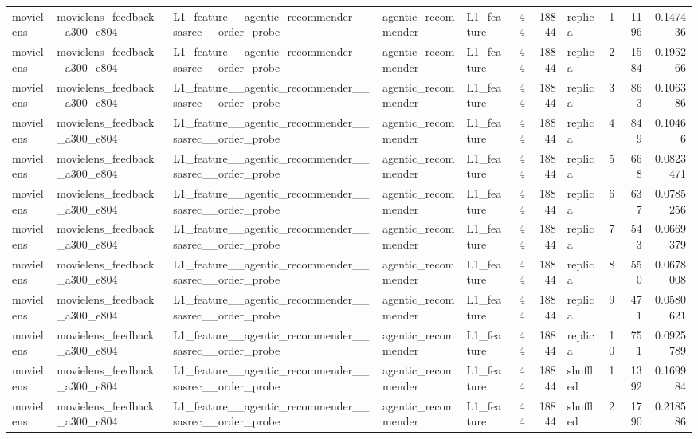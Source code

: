 \begin{table}[htbp!]
\begin{tabular}{lllllrrlrrr}
movielens & movielens\_feedback\_a300\_e804 & L1\_feature\_\_agentic\_recommender\_\_sasrec\_\_order\_probe & agentic\_recommender & L1\_feature & 44 & 18844 & replica & 1 & 1196 & 0.147436 \\
movielens & movielens\_feedback\_a300\_e804 & L1\_feature\_\_agentic\_recommender\_\_sasrec\_\_order\_probe & agentic\_recommender & L1\_feature & 44 & 18844 & replica & 2 & 1584 & 0.195266 \\
movielens & movielens\_feedback\_a300\_e804 & L1\_feature\_\_agentic\_recommender\_\_sasrec\_\_order\_probe & agentic\_recommender & L1\_feature & 44 & 18844 & replica & 3 & 863 & 0.106386 \\
movielens & movielens\_feedback\_a300\_e804 & L1\_feature\_\_agentic\_recommender\_\_sasrec\_\_order\_probe & agentic\_recommender & L1\_feature & 44 & 18844 & replica & 4 & 849 & 0.10466 \\
movielens & movielens\_feedback\_a300\_e804 & L1\_feature\_\_agentic\_recommender\_\_sasrec\_\_order\_probe & agentic\_recommender & L1\_feature & 44 & 18844 & replica & 5 & 668 & 0.0823471 \\
movielens & movielens\_feedback\_a300\_e804 & L1\_feature\_\_agentic\_recommender\_\_sasrec\_\_order\_probe & agentic\_recommender & L1\_feature & 44 & 18844 & replica & 6 & 637 & 0.0785256 \\
movielens & movielens\_feedback\_a300\_e804 & L1\_feature\_\_agentic\_recommender\_\_sasrec\_\_order\_probe & agentic\_recommender & L1\_feature & 44 & 18844 & replica & 7 & 543 & 0.0669379 \\
movielens & movielens\_feedback\_a300\_e804 & L1\_feature\_\_agentic\_recommender\_\_sasrec\_\_order\_probe & agentic\_recommender & L1\_feature & 44 & 18844 & replica & 8 & 550 & 0.0678008 \\
movielens & movielens\_feedback\_a300\_e804 & L1\_feature\_\_agentic\_recommender\_\_sasrec\_\_order\_probe & agentic\_recommender & L1\_feature & 44 & 18844 & replica & 9 & 471 & 0.0580621 \\
movielens & movielens\_feedback\_a300\_e804 & L1\_feature\_\_agentic\_recommender\_\_sasrec\_\_order\_probe & agentic\_recommender & L1\_feature & 44 & 18844 & replica & 10 & 751 & 0.0925789 \\
movielens & movielens\_feedback\_a300\_e804 & L1\_feature\_\_agentic\_recommender\_\_sasrec\_\_order\_probe & agentic\_recommender & L1\_feature & 44 & 18844 & shuffled & 1 & 1392 & 0.169984 \\
movielens & movielens\_feedback\_a300\_e804 & L1\_feature\_\_agentic\_recommender\_\_sasrec\_\_order\_probe & agentic\_recommender & L1\_feature & 44 & 18844 & shuffled & 2 & 1790 & 0.218586 \\

\end{tabular}
\end{table}

